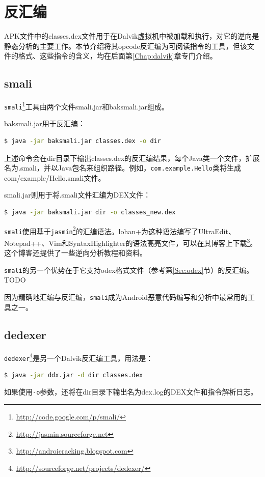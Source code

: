 \section{反汇编}
APK文件中的classes.dex文件用于在Dalvik虚拟机中被加载和执行，对它的逆向是静态分析的主要工作。本节介绍将其opcode反汇编为可阅读指令的工具，但该文件的格式、这些指令的含义，均在后面第\ref{Chap:dalvik}章专门介绍。

\subsection{smali}
\lstinline!smali!\footnote{\url{http://code.google.com/p/smali/}}工具由两个文件smali.jar和baksmali.jar组成。

baksmali.jar用于反汇编：
\begin{lstlisting}[language=bash, numbers=none]
 $ java -jar baksmali.jar classes.dex -o dir
\end{lstlisting}
上述命令会在dir目录下输出classes.dex的反汇编结果，每个Java类一个文件，扩展名为.smali，并以Java包名来组织路径。例如，\lstinline!com.example.Hello!类将生成com/example/Hello.smali文件。

smali.jar则用于将.smali文件汇编为DEX文件：
\begin{lstlisting}[language=bash, numbers=none]
 $ java -jar baksmali.jar dir -o classes_new.dex
\end{lstlisting}

\lstinline!smali!使用基于\lstinline!jasmin!\footnote{\url{http://jasmin.sourceforge.net}}的汇编语法。lohan+为这种语法编写了UltraEdit、Notepad++、Vim和SyntaxHighlighter的语法高亮文件，可以在其博客上下载\footnote{\url{http://androicracking.blogspot.com}}。这个博客还提供了一些逆向分析教程和资料。

\lstinline!smali!的另一个优势在于它支持odex格式文件（参考第\ref{Sec:odex}节）的反汇编。TODO

因为精确地汇编与反汇编，\lstinline!smali!成为Android恶意代码编写和分析中最常用的工具之一。

\subsection{dedexer}
\lstinline!dedexer!\footnote{\url{http://sourceforge.net/projects/dedexer/}}是另一个Dalvik反汇编工具，用法是：
\begin{lstlisting}[language=bash, numbers=none]
 $ java -jar ddx.jar -d dir classes.dex
\end{lstlisting}
如果使用\lstinline!-o!参数，还将在dir目录下输出名为dex.log的DEX文件和指令解析日志。

